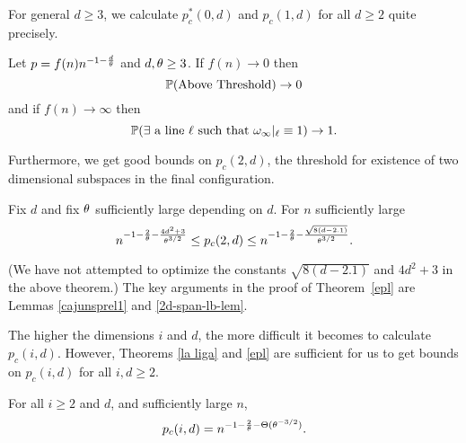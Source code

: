 For general $d\ge 3$, 
we calculate $p_c^*(0,d)$ and $p_c(1,d)$ for all $d\geq 2$ quite
precisely.
\begin{theorem} \label{la liga}
Let $p=f(n)n^{-1-\frac{d}{\theta}}$ and $d,\theta \geq 3$.
If $f(n)\to 0$ then $$\mathbb{P}(\text{Above Threshold}) \to 0$$
and
if $f(n)\to \infty$ then $$\mathbb{P}(\exists \text{ a line $\ell$ such that } \omega_\infty|_\ell\equiv1) \to 1.$$
\end{theorem}

Furthermore, we get good bounds on 
$p_c(2,d)$, the threshold for existence of two dimensional subspaces in the final configuration.
\begin{theorem} \label{epl} Fix $d$ and fix $\theta$ sufficiently large depending on $d$. For $n$ sufficiently large 
$$n^{-1 - \frac{2}{\theta} - \frac{4d^2 + 3}{\theta^{3/2}}}
\leq p_c(2,d) \leq
n^{-1 - \frac{2}{\theta} - \frac{\sqrt{8(d-2.1)}}{\theta^{3/2}}}.
$$
\end{theorem}
(We have not attempted to optimize the constants $\sqrt{8(d-2.1)}$ and $4d^2 + 3$ in the above theorem.)
The key arguments in the proof of Theorem~\ref{epl} are Lemmas \ref{cajunsprel1} and \ref{2d-span-lb-lem}.

The higher the dimensions $i$ and $d$, 
the more difficult it becomes to calculate $p_c(i,d)$. 
However, Theorems \ref{la liga}  and \ref{epl} are sufficient for us to get bounds on $p_c(i,d)$ for all $i,d \geq 2$.

\begin{theorem}
For all $i\ge 2$ and $d$, and sufficiently large $n$,
$$p_c(i,d)=n^{-1 - \frac{2}{\theta} - \Theta(\theta^{-3/2})}.$$
\end{theorem}

